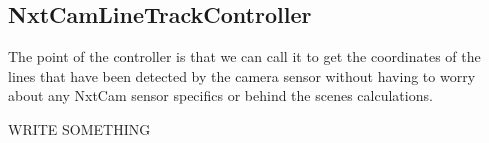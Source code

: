 \subsection{NxtCamLineTrackController} 


The point of the controller is that we can call it to get the coordinates of the lines that have been detected by the camera sensor without having to worry about any NxtCam sensor specifics or behind the scenes calculations. 


WRITE SOMETHING













